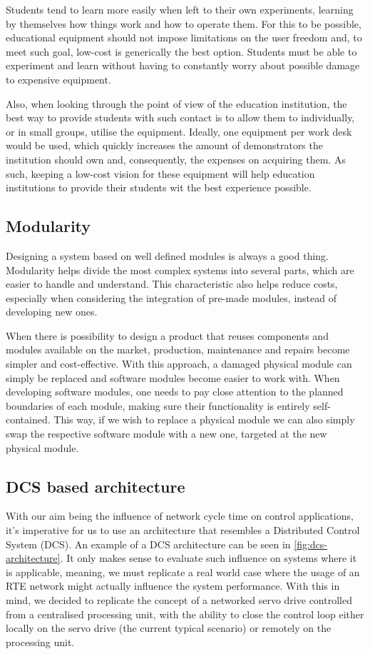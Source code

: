 Students tend to learn more easily when left to their own experiments, learning by themselves how things work and how to operate them. %
For this to be possible, educational equipment should not impose limitations on the user freedom and, to meet such goal, low-cost is generically the best option.
Students must be able to experiment and learn without having to constantly worry about possible damage to expensive equipment.

Also, when looking through the point of view of the education institution, the best way to provide students with such contact is to allow them to individually, or in small groups, utilise the equipment.
Ideally, one equipment per work desk would be used, which quickly increases the amount of demonstrators the institution should own and, consequently, the expenses on acquiring them.
As such, keeping a low-cost vision for these equipment will help education institutions to provide their students wit the best experience possible.

\subsection{Modularity}

Designing a system based on well defined modules is always a good thing.
Modularity helps divide the most complex systems into several parts, which are easier to handle and understand.
This characteristic also helps reduce costs, especially when considering the integration of pre-made modules, instead of developing new ones.

When there is possibility to design a product that reuses components and modules available on the market, production, maintenance and repairs become simpler and cost-effective.
With this approach, a damaged physical module can simply be replaced and software modules become easier to work with.
When developing software modules, one needs to pay close attention to the planned boundaries of each module, making sure their functionality is entirely self-contained.
This way, if we wish to replace a physical module we can also simply swap the respective software module with a new one, targeted at the new physical module.

\subsection{DCS based architecture}

With our aim being the influence of network cycle time on control applications, it's imperative for us to use an architecture that resembles a Distributed Control System (DCS).
An example of a DCS architecture can be seen in \autoref{fig:dcs-architecture}.
It only makes sense to evaluate such influence on systems where it is applicable, meaning, we must replicate a real world case where the usage of an RTE network might actually influence the system performance.
With this in mind, we decided to replicate the concept of a networked servo drive controlled from a centralised processing unit, with the ability to close the control loop either locally on the servo drive (the current typical scenario) or remotely on the processing unit.

